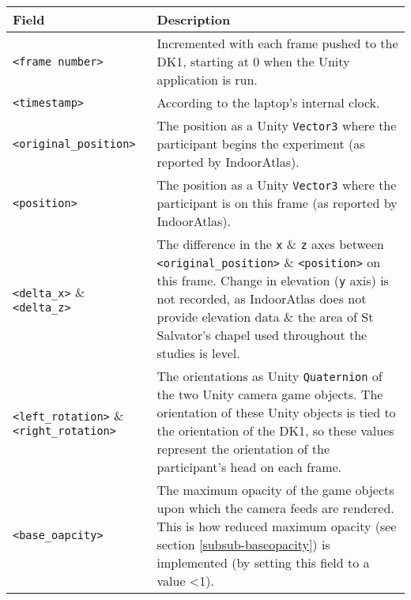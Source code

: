 \begin{center}
\begin{longtable}{ l  p{8cm} }

\toprule

\textbf{Field} & \textbf{Description} \\

\midrule

\texttt{<frame number>} & Incremented with each frame pushed to the DK1, starting at 0 when the Unity application is run. \\

\midrule

\texttt{<timestamp>} & According to the laptop's internal clock. \\

\midrule

\texttt{<original\_position>} & The position as a Unity \texttt{Vector3} where the participant begins the experiment (as reported by IndoorAtlas). \\

\midrule

\texttt{<position>} & The position as a Unity \texttt{Vector3} where the participant is on this frame (as reported by IndoorAtlas). \\

\midrule

\texttt{<delta\_x>} \& \texttt{<delta\_z>} & The difference in the \texttt{x} \& \texttt{z} axes between \texttt{<original\_position>} \& \texttt{<position>} on this frame. Change in elevation (\texttt{y} axis) is not recorded, as IndoorAtlas does not provide elevation data \& the area of St Salvator's chapel used throughout the studies is level. \\

\midrule

\texttt{<left\_rotation>} \& \texttt{<right\_rotation>} & The orientations as Unity \texttt{Quaternion} of the two Unity camera game objects. The orientation of these Unity objects is tied to the orientation of the DK1, so these values represent the orientation of the participant's head on each frame. \\

\midrule

\texttt{<base\_oapcity>} & The maximum opacity of the game objects upon which the camera feeds are rendered. This is how reduced maximum opacity (see section \ref{subsub-baseopacity}) is implemented (by setting this field to a value \textless 1). \\


\end{longtable}
\end{center}
